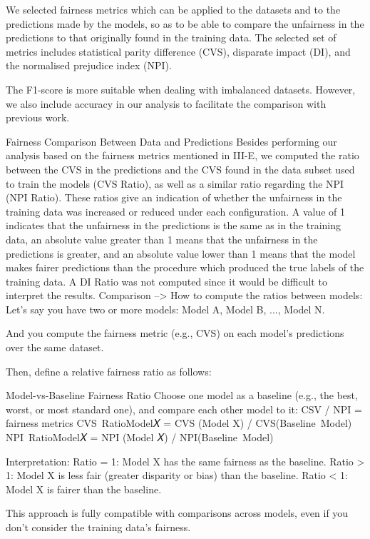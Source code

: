 \documentclass[12pt, a4paper, oneside]{book}   	%
\begin{document}
		We selected fairness metrics which can be applied to the datasets and to the predictions made by the models, so as to be able to compare the unfairness in the predictions to that originally found in the training data. The selected set of metrics includes statistical parity difference (CVS), disparate impact (DI), and the normalised prejudice index (NPI).
		
		The F1-score is more suitable when dealing with imbalanced datasets. However, we also include accuracy in our analysis to facilitate the comparison with previous work. \autocite{Valentim_2019}
		
		Fairness Comparison Between Data and Predictions
		Besides performing our analysis based on the fairness metrics mentioned in III-E, we computed the ratio between the CVS in the predictions and the CVS found in the data subset used to train the models (CVS Ratio), as well as a similar ratio regarding the NPI (NPI Ratio). These ratios give an indication of whether the unfairness in the training data was increased or reduced under each configuration. A value of 1 indicates that the unfairness in the predictions is the same as in the training data, an absolute value greater than 1 means that the unfairness in the predictions is greater, and an absolute value lower than 1 means that the model makes fairer predictions than the procedure which produced the true labels of the training data. A DI Ratio was not computed since it would be difficult to interpret the results. \autocite{Valentim}
		Comparison
		-->  How to compute the ratios between models:
		Let’s say you have two or more models: Model A, Model B, ..., Model N.
		
		And you compute the fairness metric (e.g., CVS) on each model’s predictions over the same dataset.
		
		Then, define a relative fairness ratio as follows:
		
		Model-vs-Baseline Fairness Ratio
		Choose one model as a baseline (e.g., the best, worst, or most standard one), and compare each other model to it:
		CSV / NPI = fairness metrics
		CVS RatioModel𝑋 = CVS (Model X) / CVS(Baseline Model)
​		NPI RatioModel𝑋 = NPI (Model 𝑋) / NPI(Baseline Model)
		
		Interpretation:
		Ratio = 1: Model X has the same fairness as the baseline.
		Ratio > 1: Model X is less fair (greater disparity or bias) than the baseline.
		Ratio < 1: Model X is fairer than the baseline.
		
		This approach is fully compatible with comparisons across models, even if you don’t consider the training data's fairness.
		
\end{document}
